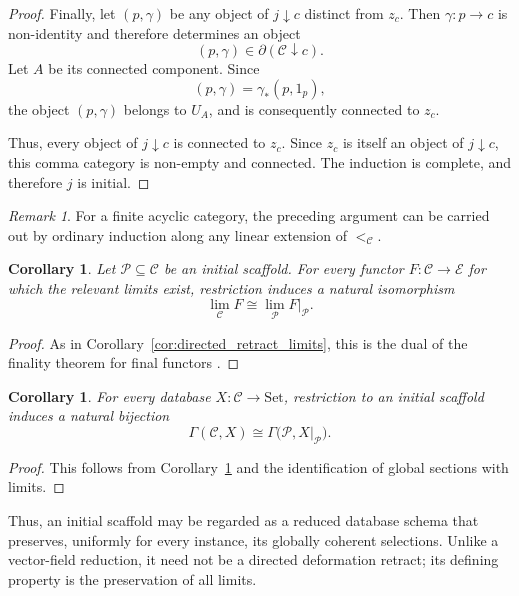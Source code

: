 \documentclass[12pt]{amsart}
\newtheorem{corollary}[teo]{Corollary}
\theoremstyle{definition}
\theoremstyle{remark}
\newtheorem{remark}[teo]{Remark}
\numberwithin{figure}{section}%
\newcommand{\CC}{\mathcal{C}}
\newcommand{\E}{\mathcal{E}}
\newcommand{\Sets}{\mathrm{Set}}
\begin{document}
\begin{proof}
Finally, let \((p,\gamma)\) be any object of \(j\downarrow c\) distinct
from \(z_c\). Then \(\gamma\colon p\to c\) is non-identity and therefore
determines an object
\[
(p,\gamma)\in\partial(\CC\downarrow c).
\]
Let \(A\) be its connected component. Since
\[
(p,\gamma)=\gamma_*(p,1_p),
\]
the object \((p,\gamma)\) belongs to \(U_A\), and is consequently
connected to \(z_c\).

Thus, every object of \(j\downarrow c\) is connected to \(z_c\). Since
\(z_c\) is itself an object of \(j\downarrow c\), this comma category is
non-empty and connected. The induction is complete, and therefore \(j\)
is initial.
\end{proof}
\begin{remark}\label{rem:finite-case}
For a finite acyclic category, the preceding argument can be carried out
by ordinary induction along any linear extension of \(<_\CC\).
\end{remark}

\begin{corollary}\label{cor:scaffold-preserves-limits}
Let \(\mathcal P\subseteq\CC\) be an initial scaffold. For every functor
\(F\colon\CC\to\E\) for which the relevant limits exist, restriction
induces a natural isomorphism
\[
\lim_\CC F
\cong
\lim_{\mathcal P}F|_{\mathcal P}.
\]
\end{corollary}

\begin{proof}
As in Corollary~\ref{cor:directed_retract_limits}, this is the dual of the finality theorem for final functors \cite[Chapter~IX, Section~3]{MacLaneCategories}.
\end{proof}

\begin{corollary}\label{cor:scaffold-database-sections}
For every database \(X\colon\CC\to\Sets\), restriction to an initial
scaffold induces a natural bijection
\[
\Gamma(\CC,X)
\cong
\Gamma\bigl(\mathcal P,X|_{\mathcal P}\bigr).
\]
\end{corollary}

\begin{proof}
This follows from
Corollary~\ref{cor:scaffold-preserves-limits} and the identification of
global sections with limits.
\end{proof}

Thus, an initial scaffold may be regarded as a reduced database schema
that preserves, uniformly for every instance, its globally coherent
selections. Unlike a vector-field reduction, it need not be a directed
deformation retract; its defining property is the preservation of all
limits.
\end{document}
